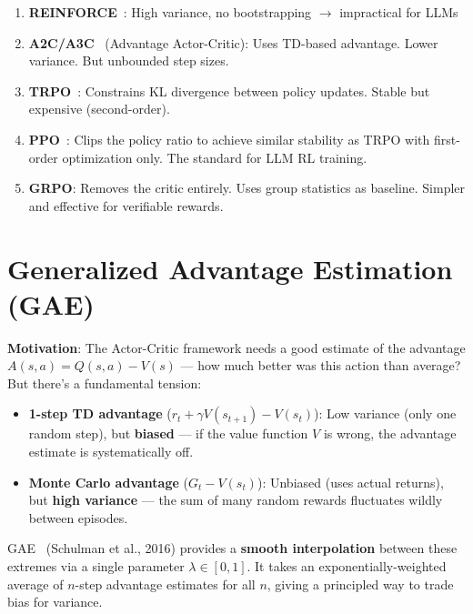\begin{keybox}
\begin{enumerate}
  \item \textbf{REINFORCE}~\cite{williams1992simple}: High variance, no bootstrapping $\rightarrow$ impractical for LLMs
  \item \textbf{A2C/A3C}~\cite{mnih2016asynchronous} (Advantage Actor-Critic): Uses TD-based advantage. Lower variance. But unbounded step sizes.
  \item \textbf{TRPO}~\cite{schulman2015trust}: Constrains KL divergence between policy updates. Stable but expensive (second-order).
  \item \textbf{PPO}~\cite{schulman2017proximal}: Clips the policy ratio to achieve similar stability as TRPO with first-order optimization only. The standard for LLM RL training.
  \item \textbf{GRPO}: Removes the critic entirely. Uses group statistics as baseline. Simpler and effective for verifiable rewards.
\end{enumerate}
\end{keybox}

\section{Generalized Advantage Estimation (GAE)}
\label{generalized-advantage-estimation-gae}

\textbf{Motivation}: The Actor-Critic framework needs a good estimate of the advantage $A(s,a) = Q(s,a) - V(s)$ --- how much better was this action than average? But there’s a fundamental tension:

\begin{itemize}
  \item \textbf{1-step TD advantage} ($r_t + \gamma V(s_{t+1}) - V(s_t)$): Low variance (only one random step), but \textbf{biased} --- if the value function $V$ is wrong, the advantage estimate is systematically off.
  \item \textbf{Monte Carlo advantage} ($G_t - V(s_t)$): Unbiased (uses actual returns), but \textbf{high variance} --- the sum of many random rewards fluctuates wildly between episodes.
\end{itemize}

GAE~\cite{schulman2016high} (Schulman et al., 2016) provides a \textbf{smooth interpolation} between these extremes via a single parameter $\lambda \in [0, 1]$. It takes an exponentially-weighted average of $n$-step advantage estimates for all $n$, giving a principled way to trade bias for variance.

